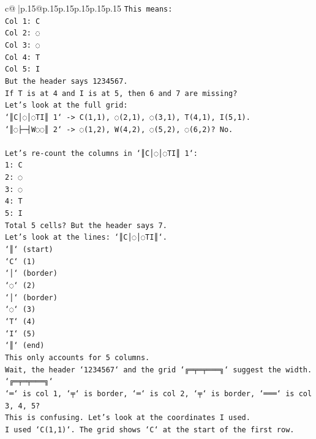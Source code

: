 \documentclass{article}
\begin{document}
{\begin{supertabular}{c@{$\;$}|p{.15\linewidth}@{}p{.15\linewidth}p{.15\linewidth}p{.15\linewidth}p{.15\linewidth}p{.15\linewidth}}
{{{\texttt{This means:} \\
\texttt{Col 1: C} \\
\texttt{Col 2: ◌} \\
\texttt{Col 3: ◌} \\
\texttt{Col 4: T} \\
\texttt{Col 5: I} \\
\texttt{But the header says 1234567.} \\
\texttt{If T is at 4 and I is at 5, then 6 and 7 are missing?} \\
\texttt{Let's look at the full grid:} \\
\texttt{`║C│◌│◌TI║ 1` {-}> C(1,1), ◌(2,1), ◌(3,1), T(4,1), I(5,1).} \\
\texttt{`║◌├─┤W◌◌║ 2` {-}> ◌(1,2), W(4,2), ◌(5,2), ◌(6,2)? No.} \\
\\ 
\texttt{Let's re{-}count the columns in `║C│◌│◌TI║ 1`:} \\
\texttt{1: C} \\
\texttt{2: ◌} \\
\texttt{3: ◌} \\
\texttt{4: T} \\
\texttt{5: I} \\
\texttt{Total 5 cells? But the header says 7.} \\
\texttt{Let's look at the lines: `║C│◌│◌TI║`.} \\
\texttt{`║` (start)} \\
\texttt{`C` (1)} \\
\texttt{`│` (border)} \\
\texttt{`◌` (2)} \\
\texttt{`│` (border)} \\
\texttt{`◌` (3)} \\
\texttt{`T` (4)} \\
\texttt{`I` (5)} \\
\texttt{`║` (end)} \\
\texttt{This only accounts for 5 columns.} \\
\texttt{Wait, the header `1234567` and the grid `╔═╤═╤═══╗` suggest the width.} \\
\texttt{`╔═╤═╤═══╗`} \\
\texttt{`═` is col 1, `╤` is border, `═` is col 2, `╤` is border, `═══` is col 3, 4, 5?} \\
\texttt{This is confusing. Let's look at the coordinates I used.} \\
\texttt{I used `C(1,1)`. The grid shows `C` at the start of the first row.} \\
}}}
\end{supertabular}}
\end{document}
